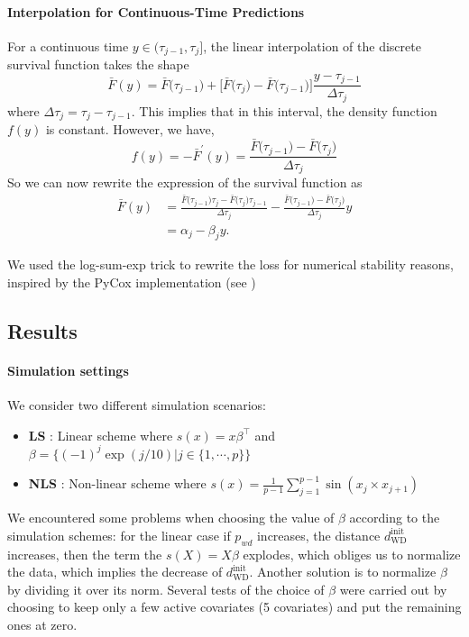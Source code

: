 \documentclass[12pt]{article}
\theoremstyle{plain}
\theoremstyle{definition}
\theoremstyle{remark}
\begin{document}
\paragraph{Interpolation for Continuous-Time Predictions}
For a continuous time $y \in\Big(\tau_{j-1}, \tau_{j}\Big]$, the linear interpolation of the discrete survival function takes the shape
\begin{equation*}
    \bar{F}(y)=\bar{F}\Big(\tau_{j-1}\Big)+\Big[\bar{F}\Big(\tau_{j}\Big)-\bar{F}\Big(\tau_{j-1}\Big)\Big] \frac{y-\tau_{j-1}}{\Delta \tau_{j}}
\end{equation*}
where $\Delta \tau_{j}=\tau_{j}-\tau_{j-1}$. This implies that in this interval, the density function $f(y)$ is constant. However, we have, 
\begin{equation*}
 f(y)=-\bar{F}^{\prime}(y)=\frac{\bar{F}\Big(\tau_{j-1}\Big)-\bar{F}\Big(\tau_{j}\Big)}{\Delta \tau_{j}}   
\end{equation*}
So we can now rewrite the expression of the survival function as
\begin{align*}
\bar{F}(y)&=\frac{\bar{F}\Big(\tau_{j-1}\Big) \tau_{j}-\bar{F}\Big(\tau_{j}\Big) \tau_{j-1}}{\Delta \tau_{j}}-\frac{\bar{F}\Big(\tau_{j-1}\Big)-\bar{F}\Big(\tau_{j}\Big)}{\Delta \tau_{j}} y \\
&= \alpha_{j}-\beta_{j} y.
\end{align*}

We used the log-sum-exp trick to rewrite the loss for numerical stability reasons, inspired by the PyCox implementation (see \cite{kvamme2019continuous})
\subsection{Results } 




\paragraph{Simulation settings}
We consider two different simulation scenarios: 
\begin{itemize}
    \item \textbf{LS}  : Linear scheme where  $s(x) = x\beta ^\top$ and $\beta =\{ (-1)^j \exp(j/10) | j \in \{1,\cdots,p\}    \}$
    \item \textbf{NLS} : Non-linear scheme where $s(x) = \frac{1}{p-1} \sum_{j=1}^{p-1} \sin (x_j \times x_{j+1})$
\end{itemize}

We encountered some problems when choosing the value of $\beta$ according to the simulation schemes: for the linear case if $p_{wd}$ increases, the distance $d_{\text{WD}}^{\text{init}}$ increases, then the term  the $s(X)=X\beta$ explodes, which obliges us to normalize the data,  which implies the decrease of $d_{\text{WD}}^{\text{init}}$. Another solution is to normalize $\beta$ by dividing it over its norm. Several tests of the choice of $\beta$ were carried out by choosing to keep only a few active covariates (5 covariates) and put the remaining ones at zero.
\end{document}
